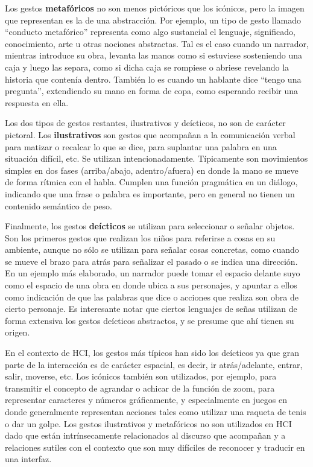 Los gestos \textbf{metafóricos} no son menos pictóricos que los icónicos, pero la imagen que representan es la de una abstracción. Por ejemplo, un tipo de gesto llamado ``conducto metafórico'' representa como algo sustancial el lenguaje, significado, conocimiento, arte u otras nociones abstractas. Tal es el caso cuando un narrador, mientras introduce su obra, levanta las manos como si estuviese sosteniendo una caja y luego las separa, como si dicha caja se rompiese o abriese revelando la historia que contenía dentro. También lo es cuando un hablante dice ``tengo una pregunta'', extendiendo su mano en forma de copa, como esperando recibir una respuesta en ella. 

Los dos tipos de gestos restantes, ilustrativos y deícticos, no son de carácter pictoral. Los \textbf{ilustrativos} son gestos que acompañan a la comunicación verbal para matizar o recalcar lo que se dice, para suplantar una palabra en una situación difícil, etc. Se utilizan intencionadamente. Típicamente son movimientos simples en dos fases (arriba/abajo, adentro/afuera) en donde la mano se mueve de forma rítmica con el habla. Cumplen una función pragmática en un diálogo, indicando que una frase o palabra es importante, pero en general no tienen un contenido semántico de peso.

Finalmente, los gestos \textbf{deícticos} se utilizan para seleccionar o señalar objetos. Son los primeros gestos que realizan los niños para referirse a cosas en su ambiente,  aunque no sólo se utilizan para señalar cosas concretas, como cuando se mueve el brazo para atrás para señalizar el pasado o se indica una dirección. En un ejemplo más elaborado, un narrador puede tomar el espacio delante suyo como el espacio de una obra en donde ubica a sus personajes, y apuntar a ellos como indicación de que las palabras que dice o acciones que realiza son obra de cierto personaje. Es interesante notar que ciertos lenguajes de señas utilizan de forma extensiva los gestos deícticos abstractos, y se presume que ahí tienen su origen.

En el contexto de HCI, los gestos más típicos han sido los deícticos ya que gran parte de la interacción es de carácter espacial, es decir, ir atrás/adelante, entrar, salir, moverse, etc. Los icónicos también son utilizados, por ejemplo, para transmitir el concepto de agrandar o achicar de la función de zoom, para representar caracteres y números gráficamente, y especialmente en juegos en donde generalmente representan acciones tales como utilizar una raqueta de tenis o dar un golpe.
Los gestos ilustrativos y metafóricos no son utilizados en HCI dado que están intrínsecamente relacionados al discurso que acompañan y a relaciones sutiles con el contexto que son muy difíciles de reconocer y traducir en una interfaz.

